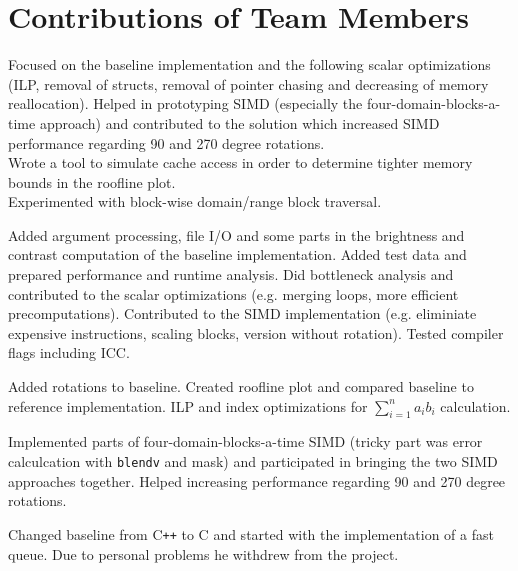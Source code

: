\section{Contributions of Team Members}

 Focused on the baseline implementation and the following scalar optimizations
(ILP, removal of structs, removal of pointer chasing and decreasing of memory reallocation).
Helped in prototyping SIMD (especially the four-domain-blocks-a-time approach)
and contributed to the solution which increased SIMD performance regarding 90 and 270 degree rotations. \\
Wrote a tool to simulate cache access in order to determine tighter memory bounds in the roofline plot. \\
Experimented with block-wise domain/range block traversal.

 Added argument processing, file I/O and some parts in the
brightness and contrast computation of the baseline implementation. Added test
data and prepared performance and runtime analysis. Did bottleneck analysis and
contributed to the scalar optimizations (e.g. merging loops, more efficient
precomputations). Contributed to the SIMD implementation (e.g. eliminiate
expensive instructions, scaling blocks, version without rotation). Tested
compiler flags including ICC.

 Added rotations to baseline. Created roofline plot and compared baseline to reference
implementation. ILP and index optimizations for $\sum_{i=1}^n a_i b_i$ calculation.

Implemented parts of four-domain-blocks-a-time SIMD (tricky part was error calculcation with
\verb|blendv| and mask) and participated in bringing the two SIMD approaches together.
Helped increasing performance regarding 90 and 270 degree rotations.

 Changed baseline from C\texttt{++} to C and started with the implementation of a fast queue.
Due to personal problems he withdrew from the project.
